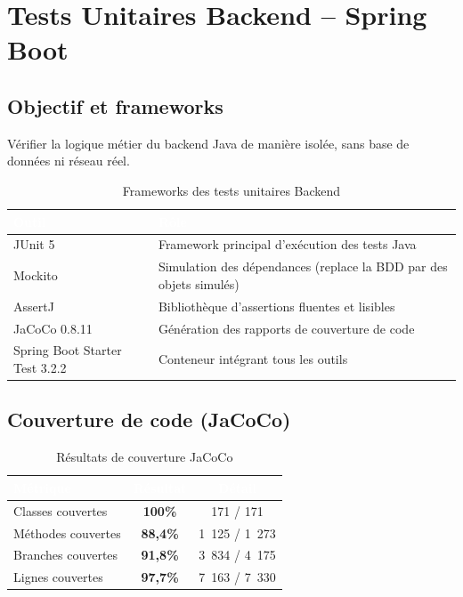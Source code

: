\documentclass[12pt,a4paper]{report}
\newcommand{\thead}[1]{\cellcolor{tablehead}\textcolor{white}{\textbf{#1}}}
\begin{document}
\section{Tests Unitaires Backend -- Spring Boot}
\label{sec:ch8-unitaires-backend}

\subsection{Objectif et frameworks}

Vérifier la logique métier du backend Java de manière isolée,
sans base de données ni réseau réel.

\begin{table}[H]
  \centering
  \caption{Frameworks des tests unitaires Backend}
  \label{tab:fw_backend}
  \begin{tabularx}{\textwidth}{|l|Y|}
    \hline
    \thead{Outil} & \thead{Rôle} \\
    \hline
    JUnit 5 & Framework principal d'exécution des tests Java \\
    Mockito & Simulation des dépendances (replace la BDD par des objets simulés) \\
    AssertJ & Bibliothèque d'assertions fluentes et lisibles \\
    JaCoCo 0.8.11 & Génération des rapports de couverture de code \\
    Spring Boot Starter Test 3.2.2 & Conteneur intégrant tous les outils \\
    \hline
  \end{tabularx}
\end{table}

\subsection{Couverture de code (JaCoCo)}

\begin{table}[H]
  \centering
  \caption{Résultats de couverture JaCoCo}
  \label{tab:jacoco}
  \begin{tabularx}{\textwidth}{|l|c|c|}
    \hline
    \thead{Métrique} & \thead{Résultat} & \thead{Détail} \\
    \hline
    Classes couvertes  & \textbf{100\%} & 171 / 171 \\
    Méthodes couvertes & \textbf{88,4\%} & 1~125 / 1~273 \\
    Branches couvertes & \textbf{91,8\%} & 3~834 / 4~175 \\
    Lignes couvertes   & \textbf{97,7\%} & 7~163 / 7~330 \\
    \hline
  \end{tabularx}
\end{table}
\end{document}
